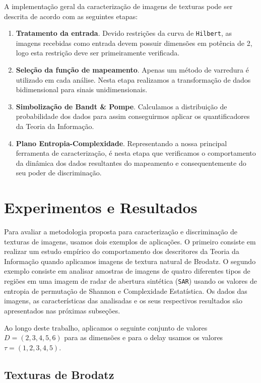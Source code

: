 \documentclass[remotesensing,article,submit,moreauthors,pdftex,10pt,a4paper]{Definitions/mdpi}
\begin{document}
	A implementação geral da caracterização de imagens de texturas pode ser descrita de acordo com as seguintes etapas:
	
	\begin{enumerate}
		\item \textbf{Tratamento da entrada}. Devido restrições da curva de \texttt{Hilbert}, as imagens recebidas como entrada devem possuir dimensões em potência de 2, logo esta restrição deve ser primeiramente verificada.
		\item \textbf{Seleção da função de mapeamento}. Apenas um método de varredura é utilizado em cada análise. Nesta etapa realizamos a transformação de dados bidimensional para sinais unidimensionais.
		\item \textbf{Simbolização de Bandt \& Pompe}. Calculamos a distribuição de probabilidade dos dados para assim conseguirmos aplicar os quantificadores da Teoria da Informação.
		\item \textbf{Plano Entropia-Complexidade}. Representando a nossa principal ferramenta de caracterização, é nesta etapa que verificamos o comportamento da dinâmica dos dados resultantes do mapeamento e consequentemente do seu poder de discriminação.
	\end{enumerate}
	
	\section{Experimentos e Resultados}\label{Resultados}
	
	Para avaliar a metodologia proposta para caracterização e discriminação de texturas de imagens, usamos dois exemplos de aplicações. O primeiro consiste em realizar um estudo empírico do comportamento dos descritores da Teoria da Informação quando aplicamos imagens de textura natural de Brodatz. O segundo exemplo consiste em analisar amostras de imagens de quatro diferentes tipos de regiões em uma imagem de radar de abertura sintética (\texttt{SAR}) usando os valores de entropia de permutação de Shannon e Complexidade Estatística. Os dados das imagens, as características das analisadas e os seus respectivos resultados são apresentados nas próximas subseções. 
	
	Ao longo deste trabalho, aplicamos o seguinte conjunto de valores $D = (2,3,4,5,6)$ para as dimensões e para o delay usamos os valores $\tau = (1,2,3,4,5)$.
	
	\subsection{Texturas de Brodatz}\label{Brodatz}
	
\end{document}
